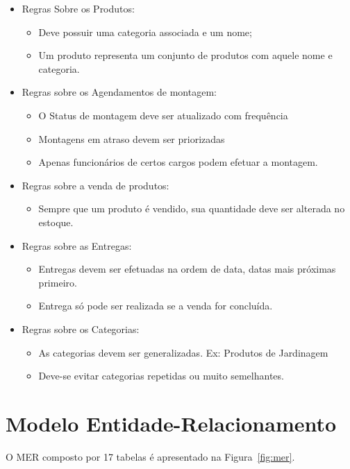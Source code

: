 \documentclass[
12pt,
a4paper,
semrecuonosumario,
sumario = abnt-6027-2012]{report}
\begin{document}
	\begin{itemize}
		\item Regras Sobre os Produtos:
			\begin{itemize}
				\item Deve possuir uma categoria associada e um nome;
				\item Um produto representa um conjunto de produtos com aquele nome e categoria.
			\end{itemize}
		\item Regras sobre os Agendamentos de montagem:
			\begin{itemize}
				\item O Status de montagem deve ser atualizado com frequência
				\item Montagens em atraso devem ser priorizadas
				\item Apenas funcionários de certos cargos podem efetuar a montagem.
			\end{itemize}
		\item Regras sobre a venda de produtos:
			\begin{itemize}
				\item Sempre que um produto é vendido, sua quantidade deve ser alterada no estoque.
			\end{itemize}
		\item Regras sobre as Entregas:
			\begin{itemize}
				\item Entregas devem ser efetuadas na ordem de data, datas mais próximas primeiro.
				\item Entrega só pode ser realizada se a venda for concluída.
			\end{itemize}
		\item Regras sobre os Categorias:
			\begin{itemize}
				\item As categorias devem ser generalizadas. Ex: Produtos de Jardinagem
				\item Deve-se evitar categorias repetidas ou muito semelhantes.
			\end{itemize}
	\end{itemize}
    
    \section{Modelo Entidade-Relacionamento}\label{sec:mer}
     O MER composto por 17 tabelas é apresentado na Figura~\ref{fig:mer}.
    
\end{document}
